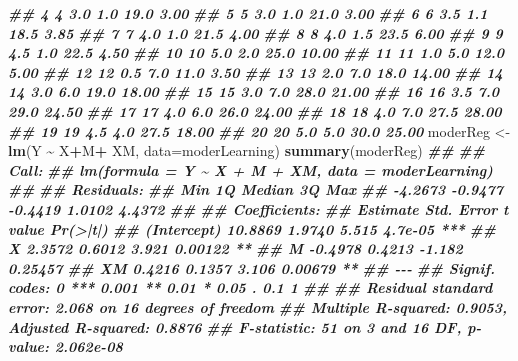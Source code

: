 \documentclass[
]{book}
\newenvironment{Shaded}{\begin{snugshade}}{\end{snugshade}}
\newcommand{\AttributeTok}[1]{\textcolor[rgb]{0.13,0.29,0.53}{#1}}
\newcommand{\DocumentationTok}[1]{\textcolor[rgb]{0.56,0.35,0.01}{\textbf{\textit{#1}}}}
\newcommand{\FunctionTok}[1]{\textcolor[rgb]{0.13,0.29,0.53}{\textbf{#1}}}
\newcommand{\NormalTok}[1]{#1}
\newcommand{\OtherTok}[1]{\textcolor[rgb]{0.56,0.35,0.01}{#1}}
\newcommand{\SpecialCharTok}[1]{\textcolor[rgb]{0.81,0.36,0.00}{\textbf{#1}}}
\begin{document}
\begin{Shaded}
\begin{Highlighting}[]
\DocumentationTok{\#\# 4   4 3.0 1.0 19.0  3.00}
\DocumentationTok{\#\# 5   5 3.0 1.0 21.0  3.00}
\DocumentationTok{\#\# 6   6 3.5 1.1 18.5  3.85}
\DocumentationTok{\#\# 7   7 4.0 1.0 21.5  4.00}
\DocumentationTok{\#\# 8   8 4.0 1.5 23.5  6.00}
\DocumentationTok{\#\# 9   9 4.5 1.0 22.5  4.50}
\DocumentationTok{\#\# 10 10 5.0 2.0 25.0 10.00}
\DocumentationTok{\#\# 11 11 1.0 5.0 12.0  5.00}
\DocumentationTok{\#\# 12 12 0.5 7.0 11.0  3.50}
\DocumentationTok{\#\# 13 13 2.0 7.0 18.0 14.00}
\DocumentationTok{\#\# 14 14 3.0 6.0 19.0 18.00}
\DocumentationTok{\#\# 15 15 3.0 7.0 28.0 21.00}
\DocumentationTok{\#\# 16 16 3.5 7.0 29.0 24.50}
\DocumentationTok{\#\# 17 17 4.0 6.0 26.0 24.00}
\DocumentationTok{\#\# 18 18 4.0 7.0 27.5 28.00}
\DocumentationTok{\#\# 19 19 4.5 4.0 27.5 18.00}
\DocumentationTok{\#\# 20 20 5.0 5.0 30.0 25.00}
\NormalTok{moderReg }\OtherTok{\textless{}{-}}\FunctionTok{lm}\NormalTok{(Y }\SpecialCharTok{\textasciitilde{}}\NormalTok{ X}\SpecialCharTok{+}\NormalTok{M}\SpecialCharTok{+}\NormalTok{ XM, }\AttributeTok{data=}\NormalTok{moderLearning)}
\FunctionTok{summary}\NormalTok{(moderReg)}
\DocumentationTok{\#\# }
\DocumentationTok{\#\# Call:}
\DocumentationTok{\#\# lm(formula = Y \textasciitilde{} X + M + XM, data = moderLearning)}
\DocumentationTok{\#\# }
\DocumentationTok{\#\# Residuals:}
\DocumentationTok{\#\#     Min      1Q  Median      3Q     Max }
\DocumentationTok{\#\# {-}4.2673 {-}0.9477 {-}0.4419  1.0102  4.4372 }
\DocumentationTok{\#\# }
\DocumentationTok{\#\# Coefficients:}
\DocumentationTok{\#\#             Estimate Std. Error t value Pr(\textgreater{}|t|)    }
\DocumentationTok{\#\# (Intercept)  10.8869     1.9740   5.515  4.7e{-}05 ***}
\DocumentationTok{\#\# X             2.3572     0.6012   3.921  0.00122 ** }
\DocumentationTok{\#\# M            {-}0.4978     0.4213  {-}1.182  0.25457    }
\DocumentationTok{\#\# XM            0.4216     0.1357   3.106  0.00679 ** }
\DocumentationTok{\#\# {-}{-}{-}}
\DocumentationTok{\#\# Signif. codes:  0 \textquotesingle{}***\textquotesingle{} 0.001 \textquotesingle{}**\textquotesingle{} 0.01 \textquotesingle{}*\textquotesingle{} 0.05 \textquotesingle{}.\textquotesingle{} 0.1 \textquotesingle{} \textquotesingle{} 1}
\DocumentationTok{\#\# }
\DocumentationTok{\#\# Residual standard error: 2.068 on 16 degrees of freedom}
\DocumentationTok{\#\# Multiple R{-}squared:  0.9053, Adjusted R{-}squared:  0.8876 }
\DocumentationTok{\#\# F{-}statistic:    51 on 3 and 16 DF,  p{-}value: 2.062e{-}08}
\end{Highlighting}
\end{Shaded}
\end{document}
